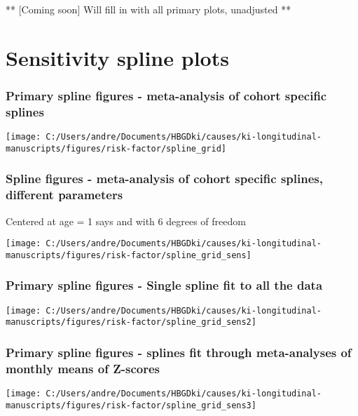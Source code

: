 \documentclass[9pt,]{book}
\begin{document}
\raggedright

** {[}Coming soon{]} Will fill in with all primary plots, unadjusted **

\chapter{Sensitivity spline plots}\label{sens_splines}

\raggedright

\subsection{Primary spline figures - meta-analysis of cohort specific
splines}\label{primary-spline-figures---meta-analysis-of-cohort-specific-splines}

\texttt{[image: C:/Users/andre/Documents/HBGDki/causes/ki-longitudinal-manuscripts/figures/risk-factor/spline\_grid]}

\subsection{Spline figures - meta-analysis of cohort specific splines,
different
parameters}\label{spline-figures---meta-analysis-of-cohort-specific-splines-different-parameters}

Centered at age = 1 says and with 6 degrees of freedom

\texttt{[image: C:/Users/andre/Documents/HBGDki/causes/ki-longitudinal-manuscripts/figures/risk-factor/spline\_grid\_sens]}

\subsection{Primary spline figures - Single spline fit to all the
data}\label{primary-spline-figures---single-spline-fit-to-all-the-data}

\texttt{[image: C:/Users/andre/Documents/HBGDki/causes/ki-longitudinal-manuscripts/figures/risk-factor/spline\_grid\_sens2]}

\subsection{Primary spline figures - splines fit through meta-analyses
of monthly means of
Z-scores}\label{primary-spline-figures---splines-fit-through-meta-analyses-of-monthly-means-of-z-scores}

\texttt{[image: C:/Users/andre/Documents/HBGDki/causes/ki-longitudinal-manuscripts/figures/risk-factor/spline\_grid\_sens3]}
\end{document}
